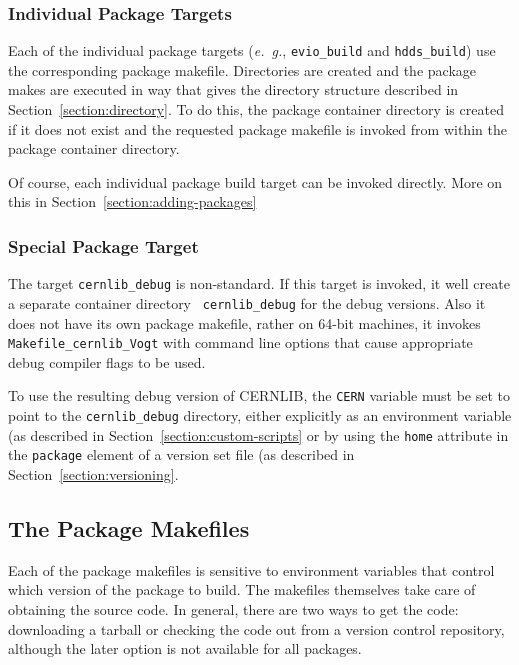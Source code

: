 \documentclass[12pt]{article}
\begin{document}
\subsubsection{Individual Package Targets}

Each of the individual package targets ({\it e.~g.}, {\tt evio\_build}
and {\tt hdds\_build}) use the corresponding package
makefile. Directories are created and the package makes are executed
in way that gives the directory structure described in
Section~\ref{section:directory}. To do this, the package container
directory is created if it does not exist and the requested package
makefile is invoked from within the package container directory.

Of course, each individual package build target can be invoked
directly. More on this in Section~\ref{section:adding-packages}

\subsubsection{Special Package Target}

The target {\tt cernlib\_debug} is non-standard. If this target is
invoked, it well create a separate container directory {\tt
  cernlib\_debug} for the debug versions. Also it does not have its
own package makefile, rather on 64-bit machines, it invokes {\tt
  Makefile\_cernlib\_Vogt} with command line options that cause
appropriate debug compiler flags to be used.

To use the resulting debug version of CERNLIB, the {\tt CERN} variable
must be set to point to the {\tt cernlib\_debug} directory, either explicitly as an environment variable (as described in Section~\ref{section:custom-scripts} or by using the {\tt home} attribute in the {\tt package} element of a version set file (as described in Section~\ref{section:versioning}.

\subsection{The Package Makefiles}\label{section:package-makefiles}

Each of the package makefiles is sensitive to environment variables
that control which version of the package to build. The makefiles
themselves take care of obtaining the source code. In general, there
are two ways to get the code: downloading a tarball or checking the
code out from a version control repository, although the later option
is not available for all packages.
\end{document}
